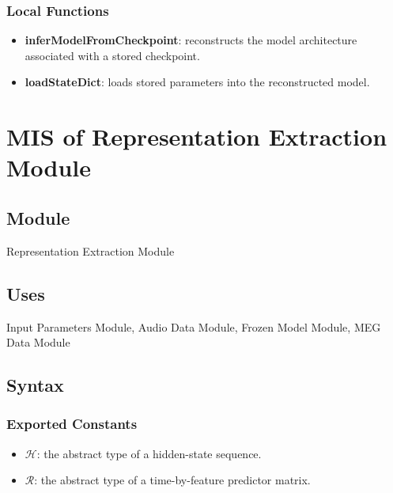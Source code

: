 \documentclass[12pt, titlepage]{article}
\begin{document}
\subsubsection{Local Functions}

\begin{itemize}
    \item \textbf{inferModelFromCheckpoint}: reconstructs the model architecture associated with a stored checkpoint.
    \item \textbf{loadStateDict}: loads stored parameters into the reconstructed model.
\end{itemize}













\newpage






\section{MIS of Representation Extraction Module} \label{Module_RepresentationExtraction}

\subsection{Module}

Representation Extraction Module

\subsection{Uses}

Input Parameters Module, Audio Data Module, Frozen Model Module, MEG Data Module

\subsection{Syntax}

\subsubsection{Exported Constants}

\begin{itemize}
    \item $\mathcal{H}$: the abstract type of a hidden-state sequence.
    \item $\mathcal{R}$: the abstract type of a time-by-feature predictor matrix.
\end{itemize}
\end{document}
